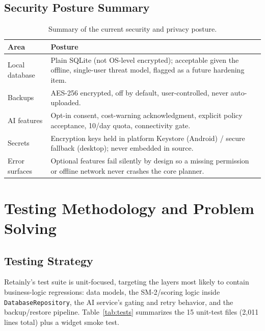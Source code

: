 \documentclass[11pt,a4paper]{article}
\begin{document}
\subsection{Security Posture Summary}
\begin{table}[h!]
\centering
\small
\begin{tabular}{p{4.4cm}p{9cm}}
\toprule
\textbf{Area} & \textbf{Posture} \\
\midrule
Local database & Plain SQLite (not OS-level encrypted); acceptable given the offline, single-user threat model, flagged as a future hardening item. \\
Backups & AES-256 encrypted, off by default, user-controlled, never auto-uploaded. \\
AI features & Opt-in consent, cost-warning acknowledgment, explicit policy acceptance, 10/day quota, connectivity gate. \\
Secrets & Encryption keys held in platform Keystore (Android) / secure fallback (desktop); never embedded in source. \\
Error surfaces & Optional features fail silently by design so a missing permission or offline network never crashes the core planner. \\
\bottomrule
\end{tabular}
\caption{Summary of the current security and privacy posture.}
\end{table}

\section{Testing Methodology and Problem Solving}

\subsection{Testing Strategy}
Retainly's test suite is unit-focused, targeting the layers most likely to contain business-logic regressions: data models, the SM-2/scoring logic inside \texttt{DatabaseRepository}, the AI service's gating and retry behavior, and the backup/restore pipeline. Table~\ref{tab:tests} summarizes the 15 unit-test files (2{,}011 lines total) plus a widget smoke test.
\end{document}
